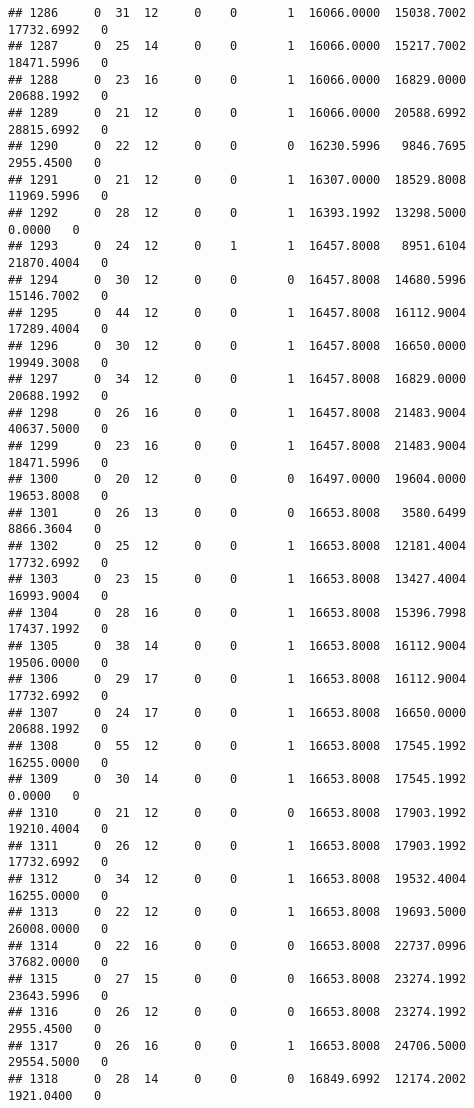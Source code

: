 \documentclass[
]{article}
\begin{document}
\begin{enumerate}
\begin{verbatim}
## 1286     0  31  12     0    0       1  16066.0000  15038.7002  17732.6992   0
## 1287     0  25  14     0    0       1  16066.0000  15217.7002  18471.5996   0
## 1288     0  23  16     0    0       1  16066.0000  16829.0000  20688.1992   0
## 1289     0  21  12     0    0       1  16066.0000  20588.6992  28815.6992   0
## 1290     0  22  12     0    0       0  16230.5996   9846.7695   2955.4500   0
## 1291     0  21  12     0    0       1  16307.0000  18529.8008  11969.5996   0
## 1292     0  28  12     0    0       1  16393.1992  13298.5000      0.0000   0
## 1293     0  24  12     0    1       1  16457.8008   8951.6104  21870.4004   0
## 1294     0  30  12     0    0       0  16457.8008  14680.5996  15146.7002   0
## 1295     0  44  12     0    0       1  16457.8008  16112.9004  17289.4004   0
## 1296     0  30  12     0    0       1  16457.8008  16650.0000  19949.3008   0
## 1297     0  34  12     0    0       1  16457.8008  16829.0000  20688.1992   0
## 1298     0  26  16     0    0       1  16457.8008  21483.9004  40637.5000   0
## 1299     0  23  16     0    0       1  16457.8008  21483.9004  18471.5996   0
## 1300     0  20  12     0    0       0  16497.0000  19604.0000  19653.8008   0
## 1301     0  26  13     0    0       0  16653.8008   3580.6499   8866.3604   0
## 1302     0  25  12     0    0       1  16653.8008  12181.4004  17732.6992   0
## 1303     0  23  15     0    0       1  16653.8008  13427.4004  16993.9004   0
## 1304     0  28  16     0    0       1  16653.8008  15396.7998  17437.1992   0
## 1305     0  38  14     0    0       1  16653.8008  16112.9004  19506.0000   0
## 1306     0  29  17     0    0       1  16653.8008  16112.9004  17732.6992   0
## 1307     0  24  17     0    0       1  16653.8008  16650.0000  20688.1992   0
## 1308     0  55  12     0    0       1  16653.8008  17545.1992  16255.0000   0
## 1309     0  30  14     0    0       1  16653.8008  17545.1992      0.0000   0
## 1310     0  21  12     0    0       0  16653.8008  17903.1992  19210.4004   0
## 1311     0  26  12     0    0       1  16653.8008  17903.1992  17732.6992   0
## 1312     0  34  12     0    0       1  16653.8008  19532.4004  16255.0000   0
## 1313     0  22  12     0    0       1  16653.8008  19693.5000  26008.0000   0
## 1314     0  22  16     0    0       0  16653.8008  22737.0996  37682.0000   0
## 1315     0  27  15     0    0       0  16653.8008  23274.1992  23643.5996   0
## 1316     0  26  12     0    0       0  16653.8008  23274.1992   2955.4500   0
## 1317     0  26  16     0    0       1  16653.8008  24706.5000  29554.5000   0
## 1318     0  28  14     0    0       0  16849.6992  12174.2002   1921.0400   0

\end{verbatim}
\end{enumerate}
\end{document}
